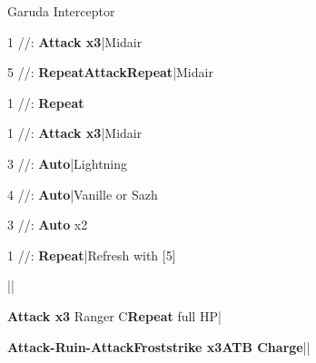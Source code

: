 \begin{fight}{Garuda Interceptor}
	\item [1] \com/\rav/\rav: \textbf{Attack x3}|Midair
	\item [5] \com/\rav/\rav: \textbf{Repeat}\to\textbf{Attack}\to\textbf{Repeat}|Midair
	\item [1] \com/\rav/\rav: \textbf{Repeat}
	\item {}
	\item [1] \com/\rav/\rav: \textbf{Attack x3}|Midair
	\item [3] \rav/\rav/\rav: \textbf{Auto}|Lightning
	\item [4] \rav/\rav/\rav: \textbf{Auto}|Vanille or Sazh
	\item [3] \rav/\rav/\rav: \textbf{Auto} x2
	\item [1] \com/\rav/\rav: \textbf{Repeat}|Refresh with [5]
	\item \skip|\save|\skip
\end{fight}

\begin{mainlist}
	\item {} \textbf{Attack x3} Ranger C\to\textbf{Repeat} full HP|\skip
	\item {} \textbf{Attack-Ruin-Attack}\to\textbf{Froststrike x3}\to\textbf{ATB Charge}||\save
\end{mainlist}
